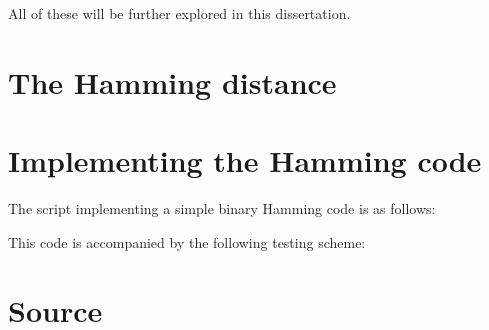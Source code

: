 \documentclass{article}
\begin{document}
    All of these will be further explored in this dissertation.

    \section{The Hamming distance}

    \section{Implementing the Hamming code}

    The script implementing a simple binary Hamming code is as follows:



    This code is accompanied by the following testing scheme:



    \section{Source}

\nocite{*}



\end{document}

